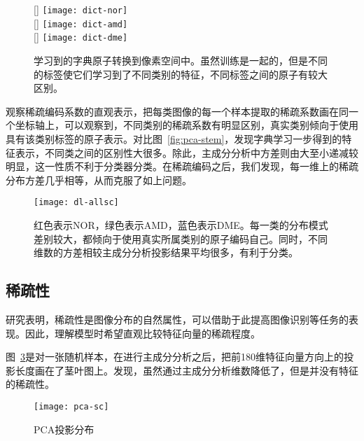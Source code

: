     \begin{figure}[h]
      \centering%
      [\textwidth] %
        {\texttt{[image: dict-nor]}} \\
        \vspace{1em}
      [\textwidth] %
        {\texttt{[image: dict-amd]}} \\
        \vspace{1em}
      [\textwidth] %
        {\texttt{[image: dict-dme]}} \\
      \caption[字典原子可视化]{学习到的字典原子转换到像素空间中。虽然训练是一起的，但是不同的标签使它们学习到了不同类别的特征，不同标签之间的原子有较大区别。}
      \label{fig:dl-dict}
    \end{figure}

    观察稀疏编码系数的直观表示，把每类图像的每一个样本提取的稀疏系数画在同一个坐标轴上，可以观察到，不同类别的稀疏系数有明显区别，真实类别倾向于使用具有该类别标签的原子表示。对比图~\ref{fig:pca-stem}，发现字典学习一步得到的特征表示，不同类之间的区别性大很多。除此，主成分分析中方差则由大至小递减较明显，这一性质不利于分类器分类。在稀疏编码之后，我们发现，每一维上的稀疏分布方差几乎相等，从而克服了如上问题。

    \begin{figure}[h]
      \centering%
      \texttt{[image: dl-allsc]}
      \caption[稀疏表示分布]{红色表示NOR，绿色表示AMD，蓝色表示DME。每一类的分布模式差别较大，都倾向于使用真实所属类别的原子编码自己。同时，不同维数的方差相较主成分分析投影结果平均很多，有利于分类。}
      \label{fig:dl-allsc}
    \end{figure}

    \subsection{稀疏性}
    研究表明，稀疏性是图像分布的自然属性，可以借助于此提高图像识别等任务的表现。因此，理解模型时希望直观比较特征向量的稀疏程度。

    图~\ref{fig:sc-pca}是对一张随机样本，在进行主成分分析之后，把前180维特征向量方向上的投影长度画在了茎叶图上。发现，虽然通过主成分分析维数降低了，但是并没有特征的稀疏性。
    \begin{figure}[h]
      \centering%
      \texttt{[image: pca-sc]}
      \caption{PCA投影分布}
      \label{fig:sc-pca}
    \end{figure}
    
